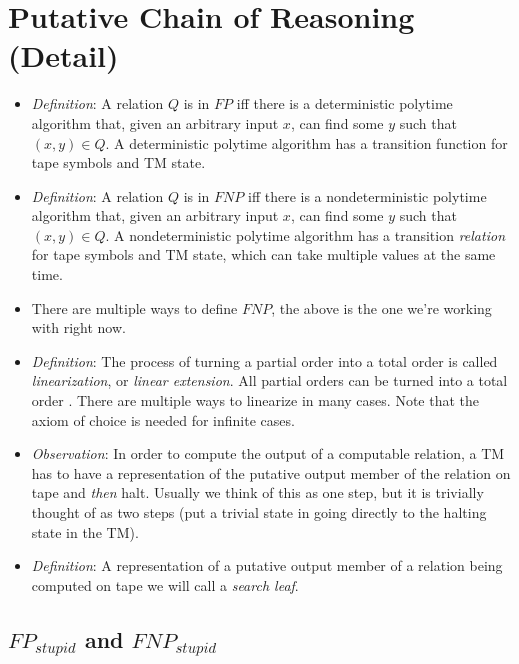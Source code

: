 \documentclass{article}
\begin{document}
\section{Putative Chain of Reasoning (Detail)}

\begin{itemize}
    \item \textit{Definition}: A relation $Q$ is in $FP$ iff there is a deterministic polytime algorithm that, given an arbitrary input $x$, can find some $y$ such that $(x, y) \in Q$. A deterministic polytime algorithm has a transition function for tape symbols and TM state.
    \item \textit{Definition}: A relation $Q$ is in $FNP$ iff there is a nondeterministic polytime algorithm that, given an arbitrary input $x$, can find some $y$ such that $(x, y) \in Q$. A nondeterministic polytime algorithm has a transition \textit{relation} for tape symbols and TM state, which can take multiple values at the same time.
    \item There are multiple ways to define $FNP$, the above is the one we're working with right now.
    \item \textit{Definition}: The process of turning a partial order into a total order is called \textit{linearization}, or \textit{linear extension}. All partial orders can be turned into a total order \cite{linearextension}. There are multiple ways to linearize in many cases. Note that the axiom of choice is needed for infinite cases.
    \item \textit{Observation}: In order to compute the output of a computable relation, a TM has to have a representation of the putative output member of the relation on tape and \textit{then} halt. Usually we think of this as one step, but it is trivially thought of as two steps (put a trivial state in going directly to the halting state in the TM).
    \item \textit{Definition}: A representation of a putative output member of a relation being computed on tape we will call a \textit{search leaf}.
\end{itemize}

\subsection{$FP_{stupid}$ and $FNP_{stupid}$}
\end{document}
